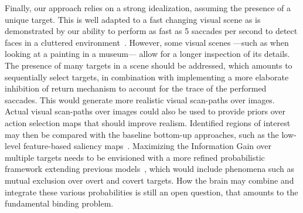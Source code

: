 Finally, our approach relies on a strong idealization, assuming the presence of a unique target. This is well adapted to a fast changing visual scene as is demonstrated by our ability to perform as fast as 5 saccades per second to detect faces in a cluttered environment~\cite{Martin18}. However, some visual scenes ---such as when looking at a painting in a museum--- allow for a longer inspection of its details. The presence of many targets in a scene should be addressed, which amounts to sequentially select targets, in combination with implementing a more elaborate inhibition of return mechanism to account for the trace of the performed saccades. This would generate more realistic visual scan-paths over images. Actual visual scan-paths over images could also be used to provide priors over action selection maps that should improve realism. Identified regions of interest may then be compared with the baseline bottom-up approaches, such as the low-level feature-based saliency maps~\cite{Itti01}. Maximizing the Information Gain over multiple targets needs to be envisioned with a more refined probabilistic framework extending previous models~\cite{Friston12}, which would include phenomena such as mutual exclusion over overt and covert targets. How the brain may combine and integrate these various probabilities is still an open question, that amounts to the fundamental binding problem. 
